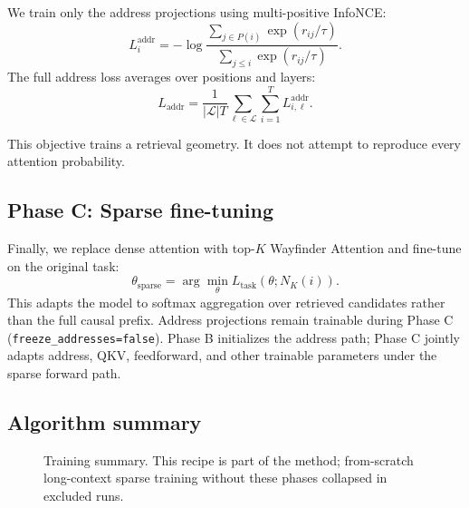 \documentclass{article}
\begin{document}
We train only the address projections using multi-positive InfoNCE:
\begin{equation}
L_i^{\mathrm{addr}}
=
-
\log
\frac{
\sum_{j \in P(i)} \exp(r_{ij}/\tau)
}{
\sum_{j \le i} \exp(r_{ij}/\tau)
}.
\end{equation}
The full address loss averages over positions and layers:
\begin{equation}
L_{\mathrm{addr}}
=
\frac{1}{|\mathcal{L}|T}
\sum_{\ell \in \mathcal{L}}
\sum_{i=1}^{T}
L_{i,\ell}^{\mathrm{addr}} .
\end{equation}

This objective trains a retrieval geometry. It does not attempt to reproduce every attention probability.

\subsection{Phase C: Sparse fine-tuning}

Finally, we replace dense attention with top-$K$ Wayfinder Attention and fine-tune on the original task:
\begin{equation}
\theta_{\mathrm{sparse}}
=
\arg\min_{\theta}
L_{\mathrm{task}}\left(\theta; N_K(i)\right).
\end{equation}
This adapts the model to softmax aggregation over retrieved candidates rather than the full causal prefix. Address projections remain trainable during Phase C (\texttt{freeze\_addresses=false}). Phase B initializes the address path; Phase C jointly adapts address, QKV, feedforward, and other trainable parameters under the sparse forward path.

\subsection{Algorithm summary}

\begin{figure}[H]
\centering
{}
\caption{Training summary. This recipe is part of the method; from-scratch long-context sparse training without these phases collapsed in excluded runs.}
\label{fig:algorithm}
\end{figure}
\end{document}
